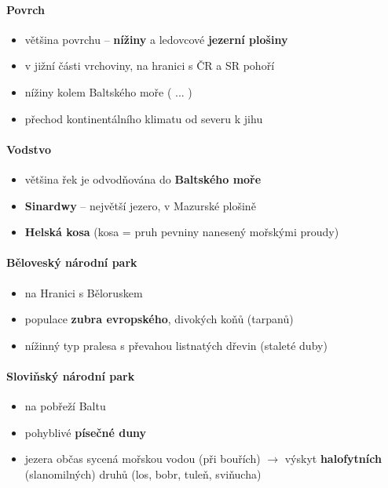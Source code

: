 \documentclass[10pt,a4paper]{article}
\newcommand{\ra}{$\rightarrow$ }
\begin{document}
\paragraph{Povrch}
\begin{itemize}
\item většina povrchu -- \textbf{nížiny} a ledovcové \textbf{jezerní plošiny}
\item v jižní části vrchoviny, na hranici s ČR a SR pohoří
\item nížiny kolem Baltského moře ( ... )
\item přechod kontinentálního klimatu od severu k jihu
\end{itemize}

\paragraph{Vodstvo}
\begin{itemize}
\item většina řek je odvodňována do \textbf{Baltského moře}
\item \textbf{Sinardwy} -- největší jezero, v Mazurské plošině
\item \textbf{Helská kosa} (kosa = pruh pevniny nanesený mořskými proudy)
\end{itemize}

\paragraph{Běloveský národní park}
\begin{itemize}
\item na Hranici s Běloruskem
\item populace \textbf{zubra evropského}, divokých koňů (tarpanů)
\item nížinný typ pralesa s převahou listnatých dřevin (staleté duby)
\end{itemize}

\paragraph{Sloviňský národní park}
\begin{itemize}
\item na pobřeží Baltu
\item pohyblivé \textbf{písečné duny}
\item jezera občas sycená mořskou vodou (při bouřích) \ra výskyt \textbf{halofytních} (slanomilných) druhů (los, bobr, tuleň, sviňucha)
\end{itemize}
\end{document}
